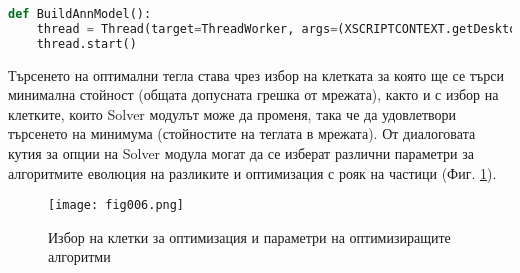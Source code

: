 \begin{lstlisting}[caption=Изпълнение с отделна нишка, language=Python, basicstyle=\tiny, label=listing010]
def BuildAnnModel():
    thread = Thread(target=ThreadWorker, args=(XSCRIPTCONTEXT.getDesktop(),))
    thread.start()
\end{lstlisting}

Търсенето на оптимални тегла става чрез избор на клетката за която ще се търси минимална стойност (общата допусната грешка от мрежата), както и с избор на клетките, които Solver модулът може да променя, така че да удовлетвори търсенето на минимума (стойностите на теглата в мрежата). От диалоговата кутия за опции на Solver модула могат да се изберат различни параметри за алгоритмите еволюция на разликите и оптимизация с рояк на частици (Фиг. \ref{fig006}).

\begin{figure}[h]
  \centering
  \texttt{[image: fig006.png]}
  \caption{Избор на клетки за оптимизация и параметри на оптимизиращите алгоритми}
\label{fig006}
\end{figure}

